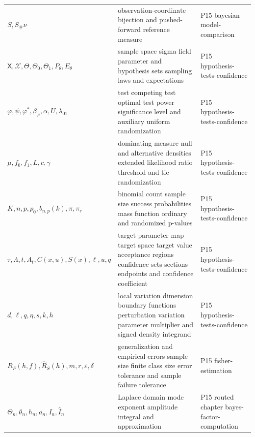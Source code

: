 \begin{longtable}{@{}p{}p{}p{}@{}}
\(S,\allowbreak S_\#\nu\) & observation-coordinate bijection and pushed-forward reference measure & P15 bayesian-\allowbreak{}model-\allowbreak{}comparison \\
\(\mathsf X,\allowbreak \mathscr X,\allowbreak \Theta,\allowbreak \Theta_0,\allowbreak \Theta_1,\allowbreak P_\theta,\allowbreak E_\theta\) & sample space sigma field parameter and hypothesis sets sampling laws and expectations & P15 hypothesis-\allowbreak{}tests-\allowbreak{}confidence \\
\(\varphi,\allowbreak \psi,\allowbreak \varphi^*,\allowbreak \beta_\varphi,\allowbreak \alpha,\allowbreak U,\allowbreak \lambda_{01}\) & test competing test optimal test power significance level and auxiliary uniform randomization & P15 hypothesis-\allowbreak{}tests-\allowbreak{}confidence \\
\(\mu,\allowbreak f_0,\allowbreak f_1,\allowbreak L,\allowbreak c,\allowbreak \gamma\) & dominating measure null and alternative densities extended likelihood ratio threshold and tie randomization & P15 hypothesis-\allowbreak{}tests-\allowbreak{}confidence \\
\(K,\allowbreak n,\allowbreak p,\allowbreak p_0,\allowbreak b_{n,p}(k),\allowbreak \pi,\allowbreak \pi_r\) & binomial count sample size success probabilities mass function ordinary and randomized p-values & P15 hypothesis-\allowbreak{}tests-\allowbreak{}confidence \\
\(\tau,\allowbreak \Lambda,\allowbreak t,\allowbreak A_t,\allowbreak C(x,\allowbreak u),\allowbreak S(x),\allowbreak \ell,\allowbreak u,\allowbreak q\) & target parameter map target space target value acceptance regions confidence sets sections endpoints and confidence coefficient & P15 hypothesis-\allowbreak{}tests-\allowbreak{}confidence \\
\(d,\allowbreak \ell,\allowbreak q,\allowbreak \eta,\allowbreak s,\allowbreak k,\allowbreak h\) & local variation dimension boundary functions perturbation variation parameter multiplier and signed density integrand & P15 hypothesis-\allowbreak{}tests-\allowbreak{}confidence \\
\(R_P(h,\allowbreak f),\allowbreak \widehat R_S(h),\allowbreak m,\allowbreak r,\allowbreak \varepsilon,\allowbreak \delta\) & generalization and empirical errors sample size finite class size error tolerance and sample failure tolerance & P15 fisher-\allowbreak{}estimation \\
\(\Theta_n,\allowbreak \theta_n,\allowbreak h_n,\allowbreak a_n,\allowbreak I_n,\allowbreak \widehat I_n\) & Laplace domain mode exponent amplitude integral and approximation & P15 routed chapter bayes-\allowbreak{}factor-\allowbreak{}computation \\

\end{longtable}
